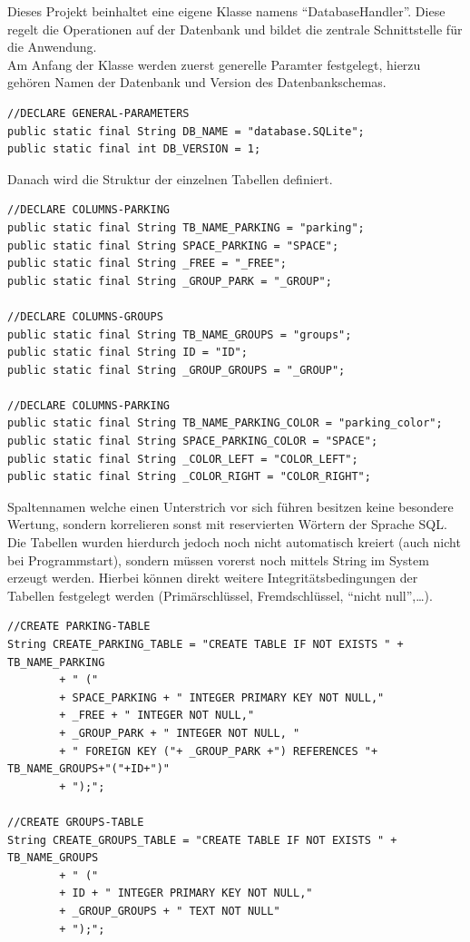 \documentclass[11pt]{article}
\begin{document}
\begin{onehalfspacing}
Dieses Projekt beinhaltet eine eigene Klasse namens "`DatabaseHandler"'. Diese
regelt die Operationen auf der Datenbank und bildet die zentrale Schnittstelle
für die Anwendung.\\
Am Anfang der Klasse werden zuerst generelle Paramter festgelegt, hierzu gehören
Namen der Datenbank und Version des Datenbankschemas.
\begin{lstlisting}
//DECLARE GENERAL-PARAMETERS
public static final String DB_NAME = "database.SQLite";
public static final int DB_VERSION = 1;
\end{lstlisting}
Danach wird die Struktur der einzelnen Tabellen definiert.
\begin{lstlisting}
//DECLARE COLUMNS-PARKING
public static final String TB_NAME_PARKING = "parking";
public static final String SPACE_PARKING = "SPACE";
public static final String _FREE = "_FREE";
public static final String _GROUP_PARK = "_GROUP";

//DECLARE COLUMNS-GROUPS
public static final String TB_NAME_GROUPS = "groups";
public static final String ID = "ID";
public static final String _GROUP_GROUPS = "_GROUP";

//DECLARE COLUMNS-PARKING
public static final String TB_NAME_PARKING_COLOR = "parking_color";
public static final String SPACE_PARKING_COLOR = "SPACE";
public static final String _COLOR_LEFT = "COLOR_LEFT";
public static final String _COLOR_RIGHT = "COLOR_RIGHT";
\end{lstlisting}

Spaltennamen welche einen Unterstrich vor sich führen besitzen keine besondere
Wertung, sondern korrelieren sonst mit reservierten Wörtern der Sprache SQL. \\

Die Tabellen wurden hierdurch jedoch noch nicht automatisch kreiert (auch nicht
bei Programmstart), sondern müssen vorerst noch mittels String im System erzeugt
werden. Hierbei können direkt weitere Integritätsbedingungen der Tabellen
festgelegt werden (Primärschlüssel, Fremdschlüssel, "`nicht null"',\ldots). 
\begin{lstlisting}
//CREATE PARKING-TABLE
String CREATE_PARKING_TABLE = "CREATE TABLE IF NOT EXISTS " + TB_NAME_PARKING
		+ " (" 
		+ SPACE_PARKING + " INTEGER PRIMARY KEY NOT NULL,"
		+ _FREE + " INTEGER NOT NULL,"
		+ _GROUP_PARK + " INTEGER NOT NULL, "
		+ " FOREIGN KEY ("+ _GROUP_PARK +") REFERENCES "+ TB_NAME_GROUPS+"("+ID+")"
		+ ");";

//CREATE GROUPS-TABLE
String CREATE_GROUPS_TABLE = "CREATE TABLE IF NOT EXISTS " + TB_NAME_GROUPS
		+ " (" 
		+ ID + " INTEGER PRIMARY KEY NOT NULL,"
		+ _GROUP_GROUPS + " TEXT NOT NULL"
		+ ");";


\end{lstlisting}
\end{onehalfspacing}
\end{document}
